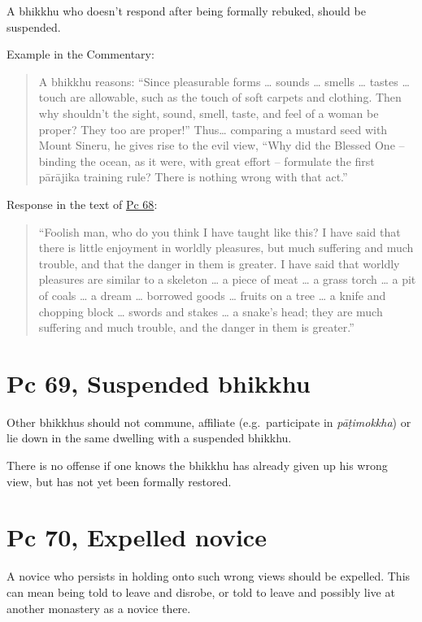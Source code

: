 A bhikkhu who doesn't respond after being formally rebuked, should be
suspended.

Example in the Commentary:

\begin{quote}
A bhikkhu reasons: ``Since pleasurable forms \ldots{} sounds \ldots{}
smells \ldots{} tastes \ldots{} touch are allowable, such as the touch
of soft carpets and clothing. Then why shouldn't the sight, sound,
smell, taste, and feel of a woman be proper? They too are proper!''
Thus\ldots{} comparing a mustard seed with Mount Sineru, he gives rise
to the evil view, ``Why did the Blessed One -- binding the ocean, as it
were, with great effort -- formulate the first pārājika training rule?
There is nothing wrong with that act.''
\end{quote}

Response in the text of
\href{https://suttacentral.net/pli-tv-bu-vb-pc68/en/brahmali}{Pc 68}:

\begin{quote}
``Foolish man, who do you think I have taught like this? I have said
that there is little enjoyment in worldly pleasures, but much suffering
and much trouble, and that the danger in them is greater. I have said
that worldly pleasures are similar to a skeleton \ldots{} a piece of
meat \ldots{} a grass torch \ldots{} a pit of coals \ldots{} a dream
\ldots{} borrowed goods \ldots{} fruits on a tree \ldots{} a knife and
chopping block \ldots{} swords and stakes \ldots{} a snake's head; they
are much suffering and much trouble, and the danger in them is
greater.''
\end{quote}

\clearpage

\section{Pc 69, Suspended bhikkhu}

Other bhikkhus should not commune, affiliate (e.g.~participate in
\emph{pāṭimokkha}) or lie down in the same dwelling with a suspended
bhikkhu.

There is no offense if one knows the bhikkhu has already given up his
wrong view, but has not yet been formally restored.

\section{Pc 70, Expelled novice}

A novice who persists in holding onto such wrong views should be
expelled. This can mean being told to leave and disrobe, or told to
leave and possibly live at another monastery as a novice there.

